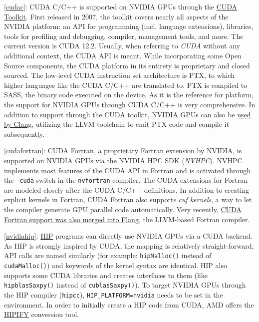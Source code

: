 \item \ref{cudac}: CUDA C/C++ is supported on NVIDIA GPUs through the \href{https://developer.nvidia.com/cuda-toolkit}{CUDA Toolkit}. First released in 2007, the toolkit covers nearly all aspects of the NVIDIA platform: an API for programming (incl. language extensions), libraries, tools for profiling and debugging, compiler, management tools, and more. The current version is CUDA 12.2. Usually, when referring to \emph{CUDA} without any additional context, the CUDA API is meant. While incorporating some Open Source components, the CUDA platform in its entirety is proprietary and closed sourced. The low-level CUDA instruction set architecture is PTX, to which higher languages like the CUDA C/C++ are translated to. PTX is compiled to SASS, the binary code executed on the device. As it is the reference for platform, the support for NVIDIA GPUs through CUDA C/C++ is very comprehensive. In addition to support through the CUDA toolkit, NVIDIA GPUs can also be \href{https://llvm.org/docs/CompileCudaWithLLVM.html}{used by Clang}, utilizing the LLVM toolchain to emit PTX code and compile it subsequently.
\item \ref{cudafortran}: CUDA Fortran, a proprietary Fortran extension by NVIDIA, is supported on NVIDIA GPUs via the \href{https://developer.nvidia.com/hpc-sdk}{NVIDIA HPC SDK} (\emph{NVHPC}). NVHPC implements most features of the CUDA API in Fortran and is activated through the \texttt{-cuda} switch in the \texttt{nvfortran} compiler. The CUDA extensions for Fortran are modeled closely after the CUDA C/C++ definitions. In addition to creating explicit kernels in Fortran, CUDA Fortran also supports \emph{cuf kernels}, a way to let the compiler generate GPU parallel code automatically. Very recently, \href{https://reviews.llvm.org/D150159}{CUDA Fortran support was also merged into Flang}, the LLVM-based Fortran compiler.
\item \ref{nvidiahip}: \href{https://github.com/ROCm-Developer-Tools/HIP}{HIP} programs can directly use NVIDIA GPUs via a CUDA backend. As HIP is strongly inspired by CUDA, the mapping is relatively straight-forward; API calls are named similarly (for example: \texttt{hipMalloc()} instead of \texttt{cudaMalloc()}) and keywords of the kernel syntax are identical. HIP also supports some CUDA libraries and creates interfaces to them (like \texttt{hipblasSaxpy()} instead of \texttt{cublasSaxpy()}). To target NVIDIA GPUs through the HIP compiler (\texttt{hipcc}), \texttt{HIP\_PLATFORM=nvidia} needs to be set in the environment. In order to initially create a HIP code from CUDA, AMD offers the \href{https://github.com/ROCm-Developer-Tools/HIPIFY}{HIPIFY} conversion tool.
